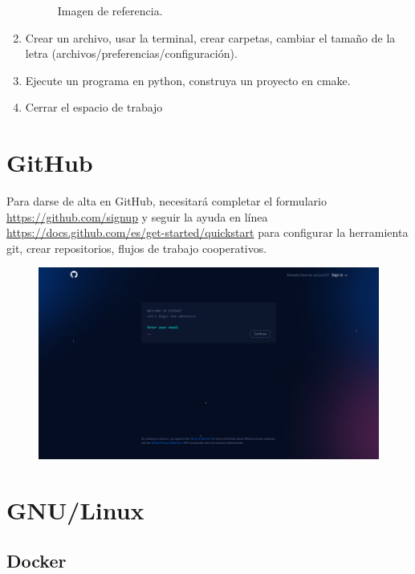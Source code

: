\begin{enumerate}
\begin{figure}[ht!]
		      \caption{Imagen de referencia.}
	      \end{figure}
        \item Crear un archivo, usar la terminal, crear carpetas, cambiar el tamaño de la letra (archivos/preferencias/configuración).
        \item Ejecute un programa en python, construya un proyecto en cmake.
        \item Cerrar el espacio de trabajo
\end{enumerate}

\section{GitHub}

Para darse de alta en GitHub, necesitará completar el formulario \url{https://github.com/signup} y seguir la ayuda en línea \url{https://docs.github.com/es/get-started/quickstart} para configurar la herramienta git, crear repositorios, flujos de trabajo cooperativos.

\begin{figure}[ht!]
	\centering
	\includegraphics[width=.6\paperwidth]{images/signup}
\end{figure}



\section{GNU/Linux}

\subsection{Docker}

